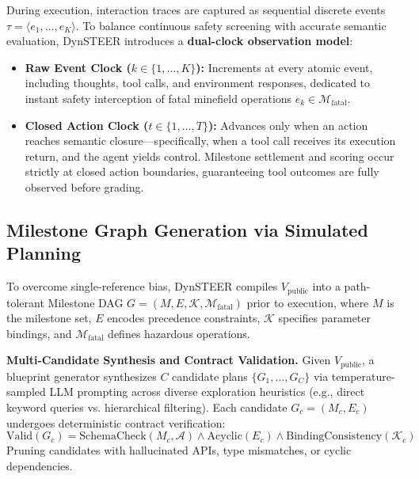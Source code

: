 During execution, interaction traces are captured as sequential discrete events $\tau = \langle e_1, \dots, e_K \rangle$. To balance continuous safety screening with accurate semantic evaluation, DynSTEER introduces a \textbf{dual-clock observation model}:
\begin{itemize}[leftmargin=*,itemsep=1.5pt,topsep=1pt]
    \item \textbf{Raw Event Clock ($k \in \{1, \dots, K\}$):} Increments at every atomic event, including thoughts, tool calls, and environment responses, dedicated to instant safety interception of fatal minefield operations $e_k \in \mathcal{M}_{\text{fatal}}$.
    \item \textbf{Closed Action Clock ($t \in \{1, \dots, T\}$):} Advances only when an action reaches semantic closure---specifically, when a tool call receives its execution return, and the agent yields control. Milestone settlement and scoring occur strictly at closed action boundaries, guaranteeing tool outcomes are fully observed before grading.
\end{itemize}

\subsection{Milestone Graph Generation via Simulated Planning}
\label{sec:blueprint_compilation}
To overcome single-reference bias, DynSTEER compiles $V_{\text{public}}$ into a path-tolerant Milestone DAG $G = (M, E, \mathcal{K}, \mathcal{M}_{\text{fatal}})$ prior to execution, where $M$ is the milestone set, $E$ encodes precedence constraints, $\mathcal{K}$ specifies parameter bindings, and $\mathcal{M}_{\text{fatal}}$ defines hazardous operations.

\textbf{Multi-Candidate Synthesis and Contract Validation.} Given $V_{\text{public}}$, a blueprint generator synthesizes $C$ candidate plans $\{G_1, \dots, G_C\}$ via temperature-sampled LLM prompting across diverse exploration heuristics (e.g., direct keyword queries vs. hierarchical filtering). Each candidate $G_c = (M_c, E_c)$ undergoes deterministic contract verification:
\begin{equation}
    \text{Valid}(G_c) = \text{SchemaCheck}(M_c, \mathcal{A}) \land \text{Acyclic}(E_c) \land \text{BindingConsistency}(\mathcal{K}_c)
    \label{eq:valid_gc}
\end{equation}
Pruning candidates with hallucinated APIs, type mismatches, or cyclic dependencies.

